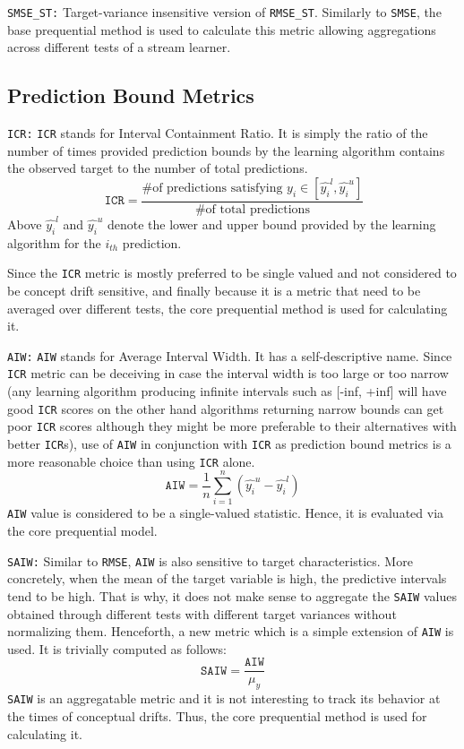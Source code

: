 \texttt{SMSE\_ST:} Target-variance insensitive version of \texttt{RMSE\_ST}. Similarly to \texttt{SMSE}, the base prequential method is used to calculate this metric allowing aggregations across different tests of a stream learner.

\subsection{Prediction Bound Metrics}

\texttt{ICR:} \texttt{ICR} stands for Interval Containment Ratio. It is simply the ratio of the number of times provided prediction bounds by the learning algorithm contains the observed target to the number of total predictions.
$$\ \texttt{ICR}=\frac{\text{\# of predictions satisfying } y_i \in [\hat{y_i}^{l},\hat{y_i}^{u}]}{\text{\# of total predictions}} $$
Above $\hat{y_i}^{l}$ and $\hat{y_i}^{u}$ denote the lower and upper bound provided by the learning algorithm for the $i_{th}$ prediction.

Since the \texttt{ICR} metric is mostly preferred to be single valued and not considered to be concept drift sensitive, and finally because it is a metric that need to be averaged over different tests, the core prequential method is used for calculating it.

\texttt{AIW:} \texttt{AIW} stands for Average Interval Width. It has a self-descriptive name. Since \texttt{ICR} metric can be deceiving in case the interval width is too large or too narrow (any learning algorithm producing infinite intervals such as [-inf, +inf] will have good \texttt{ICR} scores on the other hand algorithms returning narrow bounds can get poor \texttt{ICR} scores although they might be more preferable to their alternatives with better \texttt{ICR}s), use of \texttt{AIW} in conjunction with \texttt{ICR} as prediction bound metrics is a more reasonable choice than using \texttt{ICR} alone.
$$\texttt{AIW}=\frac{1}{n}\sum_{i=1}^{n}(\hat{y_i}^{u} - \hat{y_i}^{l})$$
\texttt{AIW} value is considered to be a single-valued statistic. Hence, it is evaluated via the core prequential model.

\texttt{SAIW:} Similar to \texttt{RMSE}, \texttt{AIW} is also sensitive to target characteristics. More concretely, when the mean of the target variable is high, the predictive intervals tend to be high. That is why, it does not make sense to aggregate the \texttt{SAIW} values obtained through different tests with different target variances without normalizing them. Henceforth, a new metric which is a simple extension of \texttt{AIW} is used. It is trivially computed as follows:
$$\texttt{SAIW} = \frac{\texttt{AIW}}{\mu _y}$$
\texttt{SAIW} is an aggregatable metric and it is not interesting to track its behavior at the times of conceptual drifts. Thus, the core prequential method is used for calculating it.   

